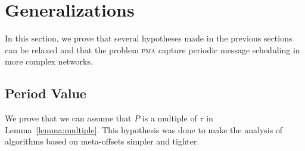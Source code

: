 \documentclass[a4paper,UKenglish,cleveref, autoref, thm-restate]{lipics-v2019}
\newcommand\pma{\textsc{pma}\xspace}
\begin{document}
\section{Generalizations}\label{sec:gen}

In this section, we prove that several hypotheses made in the previous sections can be relaxed and that the 
problem \pma capture periodic message scheduling in more complex networks.

\subsection{Period Value}


We prove that we can assume that $P$ is a multiple of $\tau$ in Lemma~\ref{lemma:multiple}. This hypothesis was done to make the analysis of algorithms based on meta-offsets simpler and tighter. 
\end{document}
